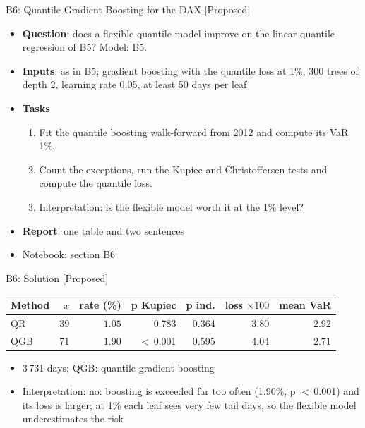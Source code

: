 \begin{frame}{B6: Quantile Gradient Boosting for the DAX [Proposed]}
\itemsize{\footnotesize}
\begin{itemize}
\item \textbf{Question}: does a flexible quantile model improve on the linear quantile regression of B5? Model: B5.
\item \textbf{Inputs}: as in B5; gradient boosting with the quantile loss at 1\%, 300 trees of depth 2, learning rate 0.05, at least 50 days per leaf
\item \textbf{Tasks}
\begin{enumerate}
    \item Fit the quantile boosting walk-forward from 2012 and compute its VaR 1\%.
    \item Count the exceptions, run the Kupiec and Christoffersen tests and compute the quantile loss.
    \item Interpretation: is the flexible model worth it at the 1\% level?
\end{enumerate}
\item \textbf{Report}: one table and two sentences
\item Notebook: section B6
\end{itemize}
\end{frame}

\ifsolutions
\begin{frame}{B6: Solution [Proposed]}
\itemsize{\footnotesize}
\begin{center}
\footnotesize
\begin{tabular}{lrrrrrr}
\toprule
Method & $x$ & rate (\%) & p Kupiec & p ind. & loss $\times 100$ & mean VaR \\
\midrule
QR & 39 & $1.05$ & 0.783 & 0.364 & $3.80$ & $2.92$ \\
QGB & 71 & $1.90$ & $<$\,0.001 & 0.595 & $4.04$ & $2.71$ \\
\bottomrule
\end{tabular}
\end{center}
\begin{itemize}
    \item 3\,731 days; QGB: quantile gradient boosting
    \item Interpretation: no: boosting is exceeded far too often (1.90\%, p $<$\,0.001) and its loss is larger; at 1\% each leaf sees very few tail days, so the flexible model underestimates the risk
\end{itemize}
\end{frame}
\fi



